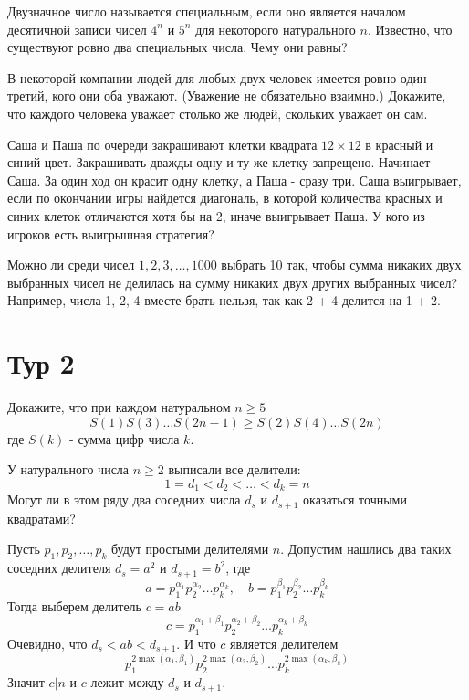 \documentclass[11pt, a4paper]{problems_template}
\begin{document}
\begin{exercise}
Двузначное число называется специальным, если оно является началом десятичной записи чисел $4^{n}$ и $5^{n}$ для некоторого натурального $n$. Известно, что существуют ровно два специальных числа. Чему они равны?
\end{exercise}

\begin{exercise}
В некоторой компании людей для любых двух человек имеется ровно один третий, кого они оба уважают. (Уважение не обязательно взаимно.) Докажите, что каждого человека уважает столько же людей, скольких уважает он сам.
\end{exercise}

\begin{exercise}
Саша и Паша по очереди закрашивают клетки квадрата $12 \times 12$ в красный и синий цвет. Закрашивать дважды одну и ту же клетку запрещено. Начинает Саша. За один ход он красит одну клетку, а Паша - сразу три. Саша выигрывает, если по окончании игры найдется диагональ, в которой количества красных и синих клеток отличаются
хотя бы на 2, иначе выигрывает Паша. У кого из игроков есть выигрышная стратегия?
\end{exercise}

\begin{exercise}
Можно ли среди чисел $1, 2, 3, \dots, 1000$ выбрать 10 так, чтобы сумма никаких двух выбранных чисел не делилась на сумму никаких двух других выбранных чисел? Например, числа 1, 2, 4 вместе брать нельзя, так как 2 + 4 делится на 1 + 2.
\end{exercise}

\section{Тур 2}

\begin{exercise}
Докажите, что при каждом натуральном $n \geqslant 5$
$$
S(1)S(3)\dots S(2n-1) \geqslant S(2)S(4)\dots S(2n)
$$
где $S(k)$ - сумма цифр числа $k$.
\end{exercise}

\begin{exercise}
У натурального числа $n \geqslant 2$ выписали все делители:
$$
1 = d_{1} < d_{2} < \dots < d_{k} = n
$$
Могут ли в этом ряду два соседних числа $d_{s}$ и $d_{s+1}$ оказаться точными квадратами?
\end{exercise}

\begin{Solution}
Пусть $p_{1}, p_{2}, \dots, p_{k}$ будут простыми делителями $n$. Допустим нашлись два таких соседних делителя $d_{s} = a^{2}$ и $d_{s+1} = b^{2}$, где
$$
a = p_{1}^{\alpha_{1}} p_{2}^{\alpha_{2}} \dots p_{k}^{\alpha_{k}}, \quad b = p_{1}^{\beta_{1}} p_{2}^{\beta_{2}} \dots p_{k}^{\beta_{k}}
$$
Тогда выберем делитель $c = ab$
$$
c = p_{1}^{\alpha_{1} + \beta_{1}} p_{2}^{\alpha_{2} + \beta_{2}} \dots p_{k}^{\alpha_{k} + \beta_{k}}  
$$
Очевидно, что $d_{s} < ab < d_{s+1}$. И что $c$ является делителем
$$
p_{1}^{2 \max(\alpha_{1}, \beta_{1})} p_{2}^{2 \max(\alpha_{2}, \beta_{2})} \dots p_{k}^{2 \max(\alpha_{k}, \beta_{k})}
$$
Значит $c | n$ и $c$ лежит между $d_{s}$ и $d_{s+1}$.
\end{Solution}
\end{document}
